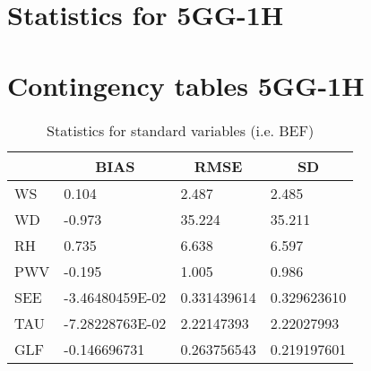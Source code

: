 \documentclass[11pt,english]{article}
\begin{document}
\section{Statistics for 5GG-1H}
\clearpage
\section{Contingency tables 5GG-1H}
\newpage
\begin{table}[]
\begin{center}
\begin{tabular}{|l|l|l|l|}
\hline
                            & \multicolumn{1}{c|}{\cellcolor[HTML]{C0C0C0}\textbf{BIAS}} & \multicolumn{1}{c|}{\cellcolor[HTML]{C0C0C0}\textbf{RMSE}} & \multicolumn{1}{c|}{\cellcolor[HTML]{C0C0C0}\textbf{SD}} \\\hline
\cellcolor[HTML]{C0C0C0}WS  &     0.104                                &     2.487                                &     2.485                                \\
\cellcolor[HTML]{C0C0C0}WD  &    -0.973                                &    35.224                                &    35.211                                \\
\cellcolor[HTML]{C0C0C0}RH  &     0.735                                &     6.638                                &     6.597                                \\
\cellcolor[HTML]{C0C0C0}PWV &    -0.195                               &     1.005                               &     0.986                               \\
\cellcolor[HTML]{C0C0C0}SEE &   -3.46480459E-02                               &   0.331439614                                   &   0.329623610                                   \\
\cellcolor[HTML]{C0C0C0}TAU &   -7.28228763E-02                               &    2.22147393                                   &    2.22027993                                   \\
\cellcolor[HTML]{C0C0C0}GLF &  -0.146696731                                   &   0.263756543                                   &   0.219197601                                   \\
\hline
\end{tabular}
\caption{Statistics for standard variables (i.e. BEF)}
\end{center}
\end{table}
\clearpage
\end{document}
